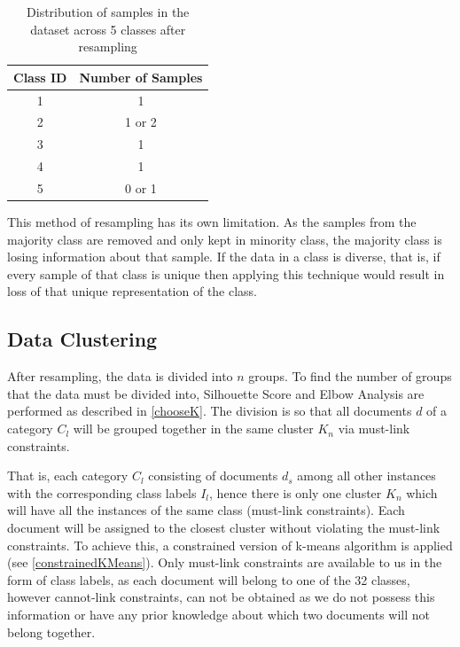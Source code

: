 \begin{table}[!ht]
\centering
\begin{tabular}{cc}
\hline
\textbf{Class ID} & \textbf{Number of Samples} \\ \hline
1                 & 1                        \\ 
2                 & 1 or 2                          \\ 
3                 & 1                          \\ 
4                 & 1                          \\ 
5                 & 0 or 1                         \\ \hline
\end{tabular}
\captionsetup{justification=centering,margin=1cm}
\caption{Distribution of samples in the dataset across 5 classes after resampling}
\label{table:SamplesDistributionDataResamplingExampleAfterResampling}
\end{table}

This method of resampling has its own limitation. As the samples from the majority class are removed and only kept in minority class, the majority class is losing information about that sample. If the data in a class is diverse, that is, if every sample of that class is unique then applying this technique would result in loss of that unique representation of the class.

\clearpage

\subsection*{Data Clustering}\label{concpeClustering}
After resampling, the data is divided into $n$ groups. To find the number of groups that the data must be divided into, Silhouette Score and Elbow Analysis are performed as described in \ref{chooseK}. The division is so that all documents $d$ of a category $C_{l}$ will be grouped together in the same cluster $K_{n}$ via must-link constraints.


That is, each category $C_{l}$ consisting of documents $d_{s}$ among all other instances with the corresponding class labels $I_{l}$, hence there is only one cluster $K_{n}$ which will have all the instances of the same class (must-link constraints). Each document will be assigned to the closest cluster without violating the must-link constraints. To achieve this, a constrained version of k-means algorithm is applied (see \ref{constrainedKMeans}). Only must-link constraints are available to us in the form of class labels, as each document will belong to one of the 32 classes, however cannot-link constraints, can not be obtained as we do not possess this information or have any prior knowledge about which two documents will not belong together. 

